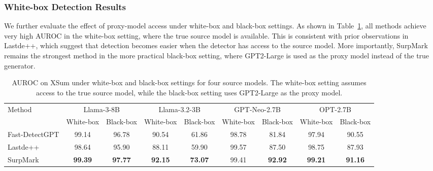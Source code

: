 \documentclass{article}
\theoremstyle{plain}
\theoremstyle{definition}
\theoremstyle{remark}
\begin{document}
\subsubsection{White-box Detection Results}
We further evaluate the effect of proxy-model access under white-box and black-box settings. 
As shown in Table~\ref{tab:xsum_white_black_box}, all methods achieve very high AUROC in the white-box setting, where the true source model is available. 
This is consistent with prior observations in Lastde++, which suggest that detection becomes easier when the detector has access to the source model. 
More importantly, SurpMark remains the strongest method in the more practical black-box setting, where GPT2-Large is used as the proxy model instead of the true generator.
\begin{table}[htbp]
\centering
\caption{AUROC on XSum under white-box and black-box settings for four source models. The white-box setting assumes access to the true source model, while the black-box setting uses GPT2-Large as the proxy model.}
\label{tab:xsum_white_black_box}
{\scriptsize
\begin{tabular}{lcc|cc|cc|cc}
\toprule
\multirow{2}{*}{Method}
& \multicolumn{2}{c}{Llama-3-8B}
& \multicolumn{2}{c}{Llama-3.2-3B}
& \multicolumn{2}{c}{GPT-Neo-2.7B}
& \multicolumn{2}{c}{OPT-2.7B} \\
\cmidrule(lr){2-3}
\cmidrule(lr){4-5}
\cmidrule(lr){6-7}
\cmidrule(lr){8-9}
& White-box & Black-box
& White-box & Black-box
& White-box & Black-box
& White-box & Black-box \\
\midrule
Fast-DetectGPT
& 99.14 & 96.78
& 90.54 & 61.86
& 98.78 & 81.84
& 97.94 & 90.55 \\

Lastde++
& 98.64 & 95.90
& 88.11 & 59.90
& 99.57 & 87.50
& 98.75 & 87.93 \\

SurpMark
& \textbf{99.39} & \textbf{97.77}
& \textbf{92.15} & \textbf{73.07}
& 99.41 & \textbf{92.92}
& \textbf{99.21} & \textbf{91.16} \\
\bottomrule
\end{tabular}}
\end{table}
\end{document}
